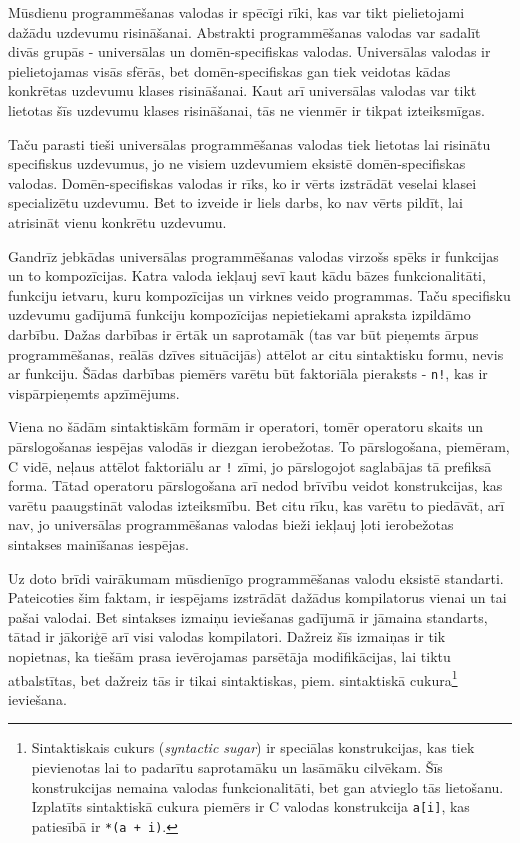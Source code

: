 Mūsdienu programmēšanas valodas ir spēcīgi rīki, kas var tikt pielietojami dažādu uzdevumu risināšanai. Abstrakti programmēšanas valodas var sadalīt divās grupās - universālas un domēn-specifiskas valodas. Universālas valodas ir pielietojamas visās sfērās, bet domēn-specifiskas gan tiek veidotas kādas konkrētas uzdevumu klases risināšanai. Kaut arī universālas valodas var tikt lietotas šīs uzdevumu klases risināšanai, tās ne vienmēr ir tikpat izteiksmīgas.

Taču parasti tieši universālas programmēšanas valodas tiek lietotas lai risinātu specifiskus uzdevumus, jo ne visiem uzdevumiem eksistē domēn-specifiskas valodas. Domēn-specifiskas valodas ir rīks, ko ir vērts izstrādāt veselai klasei specializētu uzdevumu. Bet to izveide ir liels darbs, ko nav vērts pildīt, lai atrisināt vienu konkrētu uzdevumu.

Gandrīz jebkādas universālas programmēšanas valodas virzošs spēks ir funkcijas un to kompozīcijas. Katra valoda iekļauj sevī kaut kādu bāzes funkcionalitāti, funkciju ietvaru, kuru kompozīcijas un virknes veido programmas. Taču specifisku uzdevumu gadījumā funkciju kompozīcijas nepietiekami apraksta izpildāmo darbību. Dažas darbības ir ērtāk un saprotamāk (tas var būt pieņemts ārpus programmēšanas, reālās dzīves situācijās) attēlot ar citu sintaktisku formu, nevis ar funkciju. Šādas darbības piemērs varētu būt faktoriāla pieraksts - \verb|n!|, kas ir vispārpieņemts apzīmējums.

Viena no šādām sintaktiskām formām ir operatori, tomēr operatoru skaits un pārslogošanas iespējas valodās ir diezgan ierobežotas. To pārslogošana, piemēram, C vidē, neļaus attēlot faktoriālu ar \verb|!| zīmi, jo pārslogojot saglabājas tā prefiksā forma. Tātad operatoru pārslogošana arī nedod brīvību veidot konstrukcijas, kas varētu paaugstināt valodas izteiksmību. Bet citu rīku, kas varētu to piedāvāt, arī nav, jo universālas programmēšanas valodas bieži iekļauj ļoti ierobežotas sintakses mainīšanas iespējas.

Uz doto brīdi vairākumam mūsdienīgo programmēšanas valodu eksistē standarti. Pateicoties šim faktam, ir iespējams izstrādāt dažādus kompilatorus vienai un tai pašai valodai. Bet sintakses izmaiņu ieviešanas gadījumā ir jāmaina standarts, tātad ir jākoriģē arī visi valodas kompilatori. Dažreiz šīs izmaiņas ir tik nopietnas, ka tiešām prasa ievērojamas parsētāja modifikācijas, lai tiktu atbalstītas, bet dažreiz tās ir tikai sintaktiskas, piem. sintaktiskā cukura\footnote{Sintaktiskais cukurs (\emph{syntactic sugar}) ir speciālas konstrukcijas, kas tiek pievienotas lai to padarītu saprotamāku un lasāmāku cilvēkam. Šīs konstrukcijas nemaina valodas funkcionalitāti, bet gan atvieglo tās lietošanu. Izplatīts sintaktiskā cukura piemērs ir C valodas konstrukcija \texttt{a[i]}, kas patiesībā ir \texttt{*(a + i)}.} ieviešana.

